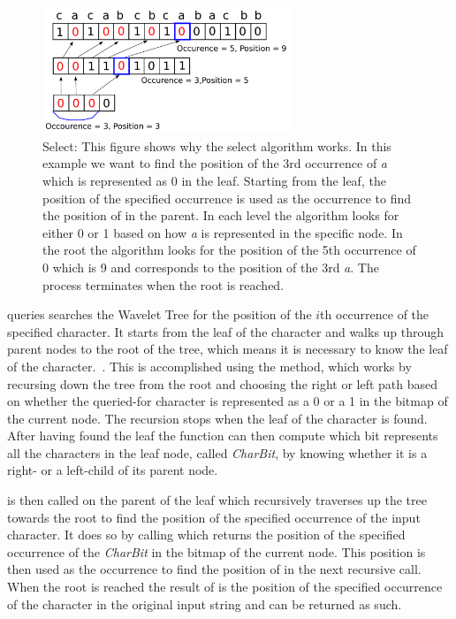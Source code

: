 \begin{figure}
\center \includegraphics[width=0.66\textwidth]{SelectDrawing}
\caption{Select: This figure shows why the select algorithm works. 
In this example we want to find the position of the 3rd occurrence of \textit{a} which is represented as 0 in the leaf.
Starting from the leaf, the position of the specified occurrence is used as the occurrence to find the position of in the parent. 
In each level the algorithm looks for either 0 or 1 based on how \textit{a} is represented in the specific node.
In the root the algorithm looks for the position of the 5th occurrence of 0 which is 9 and corresponds to the position of the 3rd \textit{a}.
The process terminates when the root is reached.}
\label{fig:SelectDrawing}
\end{figure}

 queries searches the Wavelet Tree for the position of the $i$th occurrence of the specified character.
It starts from the leaf of the character and walks up through parent nodes to the root of the tree, which means it is necessary to know the leaf of the character.~\citep[Section~2.2]{Claude08practicalrankselect}. 
This is accomplished using the  method, which works by recursing down the tree from the root and choosing the right or left path based on whether the queried-for character is represented as a 0 or a 1 in the bitmap of the current node.
The recursion stops when the leaf of the character is found.
After having found the leaf the  function can then compute which bit represents all the characters in the leaf node, called \textit{CharBit}, by knowing whether it is a right- or a left-child of its parent node.

 is then called on the parent of the leaf which recursively traverses up the tree towards the root to find the position of the specified occurrence of the input character.
It does so by calling  which returns the position of the specified occurrence of the \textit{CharBit} in the bitmap of the current node. 
This position is then used as the occurrence to find the position of in the next recursive call.
When the root is reached the result of  is the position of the specified occurrence of the character in the original input string and can be returned as such.

